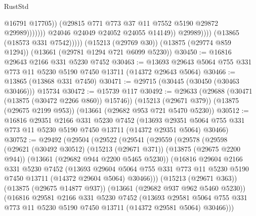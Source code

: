 \begin{lexlean}{RustStd}
\begin{coremodule}
                                      @16791
                                      @17705))
                                  (@29815 @771 @773 @37 @11 @7552 @5190 @29872 @29989)))))))
                      @24046
                      @24049
                      @24052
                      @24055
                      @14149))
                  @29989))))
          (@13865 (@18573 @331 @7542)))))
    (@15213 (@29769 @30))
    (@13875 (@29774 @859 @1294))
    (@13661 (@29781 @1294 @721 @6099 @5230))
@30450 := @16816 @29643 @2166 @331 @5230 @7452
@30463 := @13693 @29643 @5064 @755 @331 @773 @11 @5230 @5190 @7450 @13711 (@14372 @29643 @5064)
@30466 := @13865 (@13868 @331 @7450)
@30471 := @29715 (@30445 (@30450 (@30463 @30466))) @15734
@30472 := @15739 @117
@30492 := @29633
    (@29688 (@30471 (@13875 (@30472 @2266 @860)) @15746))
    (@15213 (@29671 @379))
    (@13875 (@29675 @2199 @953))
    (@13661 (@29682 @953 @721 @5470 @5230))
@30512 := @16816
    @29351
    @2166
    @331
    @5230
    @7452
    (@13693 @29351 @5064 @755 @331 @773 @11 @5230 @5190 @7450 @13711 (@14372 @29351 @5064) @30466)
@30752 := @29492
    (@29504
      (@29522
        (@29541
          (@29559
            (@29578
              (@29598
                (@29621
                  (@30492 @30512)
                  (@15213 (@29671 @371))
                  (@13875 (@29675 @2200 @944))
                  (@13661 (@29682 @944 @2200 @5465 @5230))
                  (@16816
                    @29604
                    @2166
                    @331
                    @5230
                    @7452
                    (@13693
                      @29604
                      @5064
                      @755
                      @331
                      @773
                      @11
                      @5230
                      @5190
                      @7450
                      @13711
                      (@14372 @29604 @5064)
                      @30466)))
                (@15213 (@29671 @363))
                (@13875 (@29675 @14877 @937))
                (@13661 (@29682 @937 @962 @5460 @5230))
                (@16816
                  @29581
                  @2166
                  @331
                  @5230
                  @7452
                  (@13693
                    @29581
                    @5064
                    @755
                    @331
                    @773
                    @11
                    @5230
                    @5190
                    @7450
                    @13711
                    (@14372 @29581 @5064)
                    @30466)))

\end{coremodule}
\end{lexlean}
